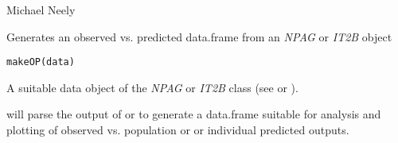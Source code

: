 \documentclass[a4paper]{book}
\begin{document}
%
\begin{Author}\relax
Michael Neely
\end{Author}
%
\begin{Description}\relax
Generates an observed vs. predicted data.frame from an \emph{NPAG} or \emph{IT2B} object
\end{Description}
%
\begin{Usage}
\begin{verbatim}
makeOP(data)
\end{verbatim}
\end{Usage}
%
\begin{Arguments}
\begin{ldescription}
\item[\code{data}] A suitable data object of the \emph{NPAG} or \emph{IT2B} class (see  or ).
\end{ldescription}
\end{Arguments}
%
\begin{Details}\relax
{} will parse the output of  or  to generate a
data.frame suitable for analysis and plotting of observed vs. population or
or individual predicted outputs.
\end{Details}
%
\end{document}
